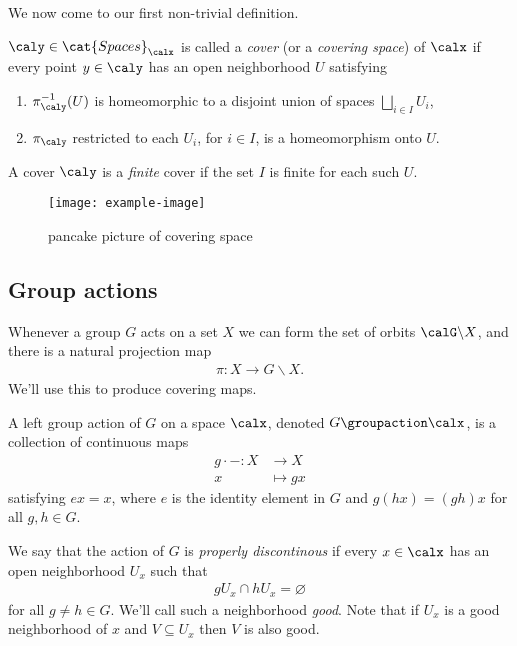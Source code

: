   We now come to our first non-trivial definition.
  \begin{definition}
    $\caly \in \cat{Spaces}_\calx$ is called a \emph{cover} (or a \emph{covering space}) of $\calx$ if every point $y \in \caly$ has an open neighborhood $U$ satisfying
    \begin{enumerate}
      \item $\pi_\caly^{-1}(U)$ is homeomorphic to a disjoint union of spaces $\bigsqcup_{i \in I} U_i $,
      \item $\pi_\caly$ restricted to each $U_i$, for $i \in I$, is a homeomorphism onto $U$.
    \end{enumerate}
    A cover $\caly$ is a \emph{finite} cover if the set $I$ is finite for each such $U$.
  \end{definition}


    \begin{figure}[H]
    \centering
      \texttt{[image: example-image]}
      \caption{pancake picture of covering space}
    \end{figure}











  \subsection{Group actions}
  Whenever a group $G$ acts on a set $X$ we can form the set of orbits $\calG \backslash X$, and there is a natural projection map
  \begin{align*}
    \pi: X \rightarrow G \backslash X.
  \end{align*}
  We'll use this to produce covering  maps.

  A left group action of $G$ on a space $\calx$, denoted $G \groupaction \calx$, is a collection of continuous maps
  \begin{align*}
    g \cdot - : X &\longrightarrow X\\
    x &\longmapsto gx
  \end{align*}
  satisfying $ex = x$, where $e$ is the identity element in $G$ and $g(hx) = (gh)x$ for all $g,h \in G$.

  We say that the action of $G$ is \emph{properly discontinous} if every $x \in \calx$ has an open neighborhood $U_x$ such that
  \begin{align*}
    gU_x \cap hU_x = \varnothing
  \end{align*}
  for all $g \neq h \in G$.
  We'll call such a neighborhood \emph{good}. Note that if $U_x$ is a good neighborhood of $x$ and $V \subseteq U_x$ then $V$ is also good.

